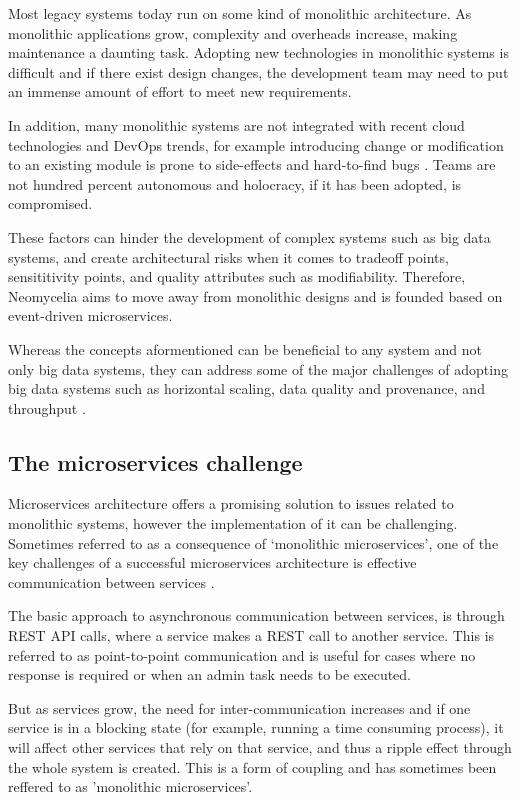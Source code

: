 \documentclass[conference]{IEEEtran}
\begin{document}
Most legacy systems today run on some kind of monolithic architecture. As monolithic applications grow, complexity and overheads increase, making maintenance a daunting task. Adopting new technologies in monolithic systems is difficult and if there exist design changes, the development team may need to put an immense amount of effort to meet new requirements.

In addition, many monolithic systems are not integrated with recent cloud technologies and DevOps trends, for example introducing change or modification to an existing module is prone to side-effects and hard-to-find bugs \cite{Bass,Fritzsch}. Teams are not hundred percent autonomous and holocracy, if it has been adopted, is compromised.

These factors can hinder the development of complex systems such as big data systems, and create architectural risks when it comes to tradeoff points, sensititivity points, and quality attributes such as modifiability. Therefore, Neomycelia aims to move away from monolithic designs and is founded based on event-driven microservices.

Whereas the concepts aformentioned can be beneficial to any system and not only big data systems, they can address some of the major challenges of adopting big data systems such as horizontal scaling, data quality and provenance, and throughput \cite{sivarajah2017critical}.

\subsection{The microservices challenge}

Microservices architecture offers a promising solution to issues related to monolithic systems, however the implementation of it can be challenging. Sometimes referred to as a consequence of ‘monolithic microservices’, one of the key challenges of a successful microservices architecture is effective communication between services \cite{Munaf}.

The basic approach to asynchronous communication between services, is through REST API calls, where a service makes a REST call to another service. This is referred to as point-to-point communication and is useful for cases where no response is required or when an admin task needs to be executed.

But as services grow, the need for inter-communication increases and if one service is in a blocking state (for example, running a time consuming process), it will affect other services that rely on that service, and thus a ripple effect through the whole system is created. This is a form of coupling and has sometimes been reffered to as 'monolithic microservices'.
\end{document}
